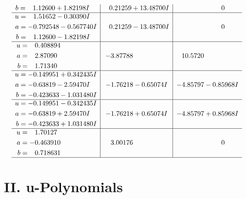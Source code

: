 \documentclass[1p]{elsarticle_modified}
\theoremstyle{definition}
\begin{document}
$$\begin{array}{c|c|c}
\begin{aligned}
b &= \phantom{-}1.12600 + 1.82198 I\end{aligned}
 & \phantom{-}0.21259 + 13.48700 I & \phantom{-0.000000 } 0 \\ \hline\begin{aligned}
u &= \phantom{-}1.51652 - 0.30390 I \\
a &= -0.792548 - 0.567740 I \\
b &= \phantom{-}1.12600 - 1.82198 I\end{aligned}
 & \phantom{-}0.21259 - 13.48700 I & \phantom{-0.000000 } 0 \\ \hline\begin{aligned}
u &= \phantom{-}0.408894\phantom{ +0.000000I} \\
a &= \phantom{-}2.87090\phantom{ +0.000000I} \\
b &= \phantom{-}1.71340\phantom{ +0.000000I}\end{aligned}
 & -3.87788\phantom{ +0.000000I} & \phantom{-}10.5720\phantom{ +0.000000I} \\ \hline\begin{aligned}
u &= -0.149951 + 0.342435 I \\
a &= -0.63819 - 2.59470 I \\
b &= -0.423633 - 1.031480 I\end{aligned}
 & -1.76218 - 0.65074 I & -4.85797 - 0.85968 I \\ \hline\begin{aligned}
u &= -0.149951 - 0.342435 I \\
a &= -0.63819 + 2.59470 I \\
b &= -0.423633 + 1.031480 I\end{aligned}
 & -1.76218 + 0.65074 I & -4.85797 + 0.85968 I \\ \hline\begin{aligned}
u &= \phantom{-}1.70127\phantom{ +0.000000I} \\
a &= -0.463910\phantom{ +0.000000I} \\
b &= \phantom{-}0.718631\phantom{ +0.000000I}\end{aligned}
 & \phantom{-}3.00176\phantom{ +0.000000I} & \phantom{-0.000000 } 0\\
 \hline 
 \end{array}$$\newpage
\newpage\renewcommand{\arraystretch}{1}
\centering \section*{ II. u-Polynomials}
\end{document}
